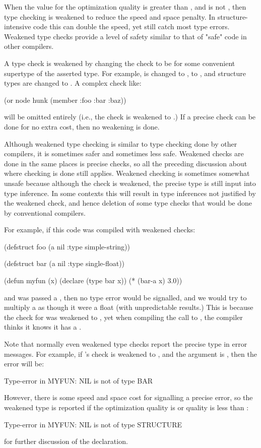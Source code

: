 {When the value for the  optimization quality is greater than
, and  is not , then type checking is weakened to
reduce the speed and space penalty.  In structure-intensive code this can
double the speed, yet still catch most type errors.  Weakened type checks
provide a level of safety similar to that of "safe" code in other \llisp{}
compilers.

A type check is weakened by changing the check to be for some
convenient supertype of the asserted type.  For example,
 is changed to ,
 to , and structure
types are changed to .  A complex check like:
\begin{example}
(or node hunk (member :foo :bar :baz))
\end{example}
will be omitted entirely (i.e., the check is weakened to \code{*}.)  If
a precise check can be done for no extra cost, then no weakening is
done.

Although weakened type checking is similar to type checking done by other
compilers, it is sometimes safer and sometimes less safe.  Weakened checks are
done in the same places is precise checks, so all the preceding discussion
about where checking is done still applies.  Weakened checking is sometimes
somewhat unsafe because although the check is weakened, the precise type is
still input into type inference.  In some contexts this will result in type
inferences not justified by the weakened check, and hence deletion of some type
checks that would be done by conventional compilers.

For example, if this code was compiled with weakened checks:
\begin{lisp}
(defstruct foo
  (a nil :type simple-string))

(defstruct bar
  (a nil :type single-float))

(defun myfun (x)
  (declare (type bar x))
  (* (bar-a x) 3.0))
\end{lisp}
and  was passed a , then no type error would be signalled, and
we would try to multiply a  as though it were a float (with
unpredictable results.)  This is because the check for  was weakened to
, yet when compiling the call to , the compiler thinks it
knows it has a .

Note that normally even weakened type checks report the precise type in error
messages.  For example, if 's  check is weakened to
, and the argument is \false{}, then the error will be:
\begin{example}
Type-error in MYFUN:
  NIL is not of type BAR
\end{example}
However, there is some speed and space cost for signalling a precise error, so
the weakened type is reported if the  optimization quality is  or
 quality is less than :
\begin{example}
Type-error in MYFUN:
  NIL is not of type STRUCTURE
\end{example}
 for further discussion of the
 declaration.

}
